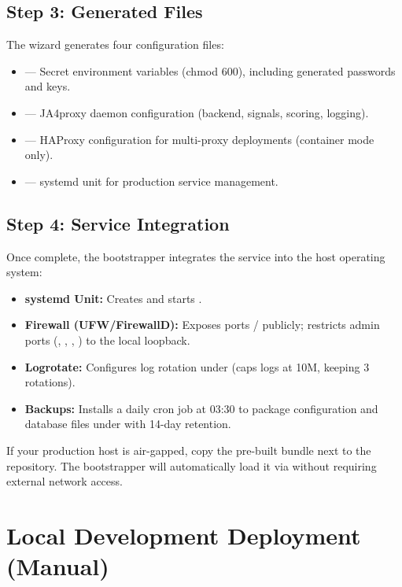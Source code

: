 \subsection{Step 3: Generated Files}
The wizard generates four configuration files:
\begin{itemize}
  \item {} --- Secret environment variables (chmod 600), including generated passwords and keys.
  \item {} --- JA4proxy daemon configuration (backend, signals, scoring, logging).
  \item {} --- HAProxy configuration for multi-proxy deployments (container mode only).
  \item {} --- systemd unit for production service management.
\end{itemize}

\subsection{Step 4: Service Integration}
Once complete, the bootstrapper integrates the service into the host operating system:
\begin{itemize}
  \item \textbf{systemd Unit:} Creates and starts .
  \item \textbf{Firewall (UFW/FirewallD):} Exposes ports / publicly; restricts admin ports (, , , ) to the local loopback.
  \item \textbf{Logrotate:} Configures log rotation under  (caps logs at 10M, keeping 3 rotations).
  \item \textbf{Backups:} Installs a daily cron job at 03:30 to package configuration and database files under  with 14-day retention.
\end{itemize}

\begin{notebox}
If your production host is air-gapped, copy the pre-built  bundle next to the repository. The bootstrapper will automatically load it via  without requiring external network access.
\end{notebox}

\section{Local Development Deployment (Manual)}

